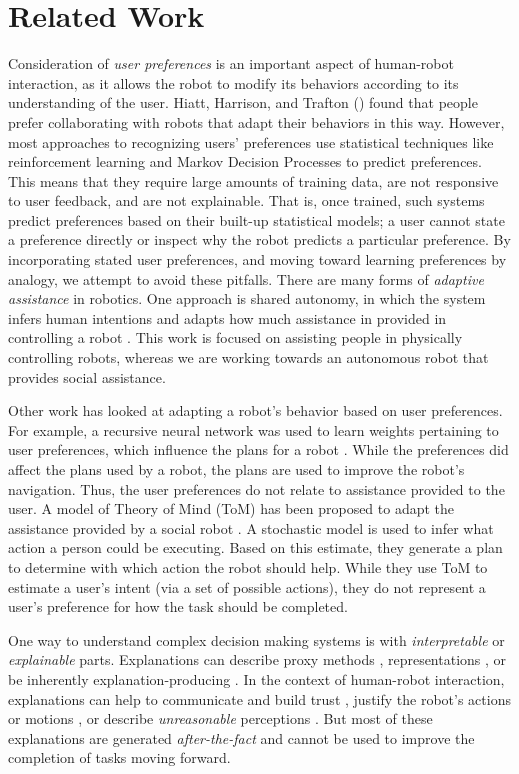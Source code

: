\documentclass[letterpaper]{article}
\begin{document}
\section{Related Work}
Consideration of \textit{user preferences} is an important aspect of human-robot interaction, as it allows the robot to modify its behaviors according to its understanding of the user. Hiatt, Harrison, and Trafton (\citeyear{hiatt2011accommodating}) found that people prefer collaborating with robots that adapt their behaviors in this way. However, most approaches to recognizing users' preferences use statistical techniques like reinforcement learning \cite{woodworth2018preference} and Markov Decision Processes \cite{munzer2017preference} to predict preferences. This means that they require large amounts of training data, are not responsive to user feedback, and are not explainable. That is, once trained, such systems predict preferences based on their built-up statistical models; a user cannot state a preference directly or inspect why the robot predicts a particular preference. By incorporating stated user preferences, and moving toward learning preferences by analogy, we attempt to avoid these pitfalls.  There are many forms of \textit{adaptive assistance} in robotics.  One approach is
shared autonomy, in which the system infers human intentions and adapts how
much assistance in provided in controlling a robot \cite{Nikolaidis2017,Jain2019}.
This work is focused on assisting people in physically controlling robots,
whereas we are working towards an autonomous robot that provides social assistance.

Other work has looked at adapting a robot's behavior based on user preferences.
For example, a recursive neural network was used
to learn weights pertaining to user preferences, which influence the plans for
a robot \cite{Bacciu2014}.  While the preferences did affect the plans used by a robot,
the plans are used to improve the
robot's navigation.  Thus, the user preferences do not relate to assistance
provided to the user.  A model of Theory of Mind (ToM) has been proposed to adapt the assistance provided
by a social robot \cite{Gorur2017}.  A stochastic model is used to infer what action a person could
be executing.  Based on this estimate, they generate a plan to determine with which
action the robot should help.
While they use ToM to estimate a user's intent (via a set of possible actions),
they do not represent a user's preference for how the task should be completed.


One way to understand complex decision making systems is with
\emph{interpretable} or \emph{explainable} parts.  Explanations can describe
proxy methods \cite{why-trust,grad-cam,visualizing}, representations
\cite{netdissect2017,cavs}, or be inherently explanation-producing
\cite{multimodal}.
In the context
of human-robot interaction, explanations can help to communicate and
build trust \cite{wang2016trust}, justify the robot's actions
\cite{stange2020effects} or motions \cite{dragan2013legibility}, or
describe \emph{unreasonable} perceptions \cite{gilpin-hri}.  But most of
these explanations are generated \emph{after-the-fact} and cannot be used
to improve the completion of tasks moving forward.
\end{document}
